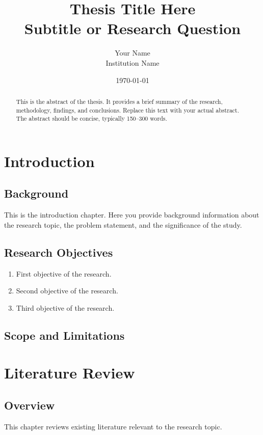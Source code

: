 \documentclass[12pt, a4paper]{report}
\title{\textbf{Thesis Title Here}\\
    \large Subtitle or Research Question}
\author{Your Name\\
    \small Institution Name}
\date{\today}
\begin{document}
\maketitle
\thispagestyle{empty}
\newpage

\begin{abstract}
    This is the abstract of the thesis. It provides a brief summary of the research,
    methodology, findings, and conclusions. Replace this text with your actual abstract.
    The abstract should be concise, typically 150--300 words.
\end{abstract}

\newpage
\tableofcontents
\newpage

\chapter{Introduction}

\section{Background}
This is the introduction chapter. Here you provide background information about the
research topic, the problem statement, and the significance of the study.

\lipsum[1]

\section{Research Objectives}
\begin{enumerate}
    \item First objective of the research.
    \item Second objective of the research.
    \item Third objective of the research.
\end{enumerate}

\section{Scope and Limitations}
\lipsum[2]

\chapter{Literature Review}

\section{Overview}
This chapter reviews existing literature relevant to the research topic.
\end{document}
